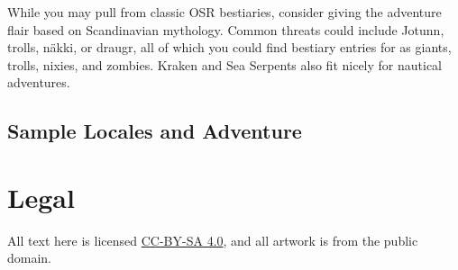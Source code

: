 \documentclass[notitlepage]{article}
\begin{document}
\begin{multicols}{2}
  While you may pull from classic OSR bestiaries, consider giving the adventure flair based on Scandinavian mythology. Common threats could include Jotunn, trolls, n\"akki, or draugr, all of which you could find bestiary entries for as giants, trolls, nixies, and zombies. Kraken and Sea Serpents also fit nicely for nautical adventures. \\

  \subsection*{Sample Locales and Adventure}

  

\section{Legal}

All text here is licensed \href{https://creativecommons.org/licenses/by-sa/4.0/}{CC-BY-SA 4.0}, and all artwork is from the public domain.

\end{multicols}
\end{document}
